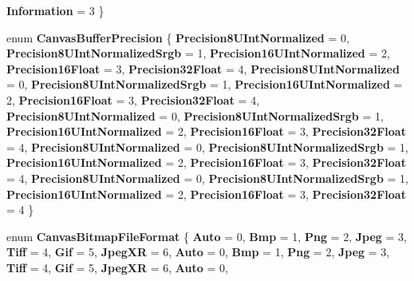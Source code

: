 \begin{DoxyCompactItemize}
{\bfseries Information} = 3
 \}
\item 
\mbox{\label{namespace_microsoft_1_1_graphics_1_1_canvas_a9383a4c9a246b43c162a06fc29843c53}} 
enum {\bfseries Canvas\+Buffer\+Precision} \{ \newline
{\bfseries Precision8\+U\+Int\+Normalized} = 0, 
{\bfseries Precision8\+U\+Int\+Normalized\+Srgb} = 1, 
{\bfseries Precision16\+U\+Int\+Normalized} = 2, 
{\bfseries Precision16\+Float} = 3, 
\newline
{\bfseries Precision32\+Float} = 4, 
{\bfseries Precision8\+U\+Int\+Normalized} = 0, 
{\bfseries Precision8\+U\+Int\+Normalized\+Srgb} = 1, 
{\bfseries Precision16\+U\+Int\+Normalized} = 2, 
\newline
{\bfseries Precision16\+Float} = 3, 
{\bfseries Precision32\+Float} = 4, 
{\bfseries Precision8\+U\+Int\+Normalized} = 0, 
{\bfseries Precision8\+U\+Int\+Normalized\+Srgb} = 1, 
\newline
{\bfseries Precision16\+U\+Int\+Normalized} = 2, 
{\bfseries Precision16\+Float} = 3, 
{\bfseries Precision32\+Float} = 4, 
{\bfseries Precision8\+U\+Int\+Normalized} = 0, 
\newline
{\bfseries Precision8\+U\+Int\+Normalized\+Srgb} = 1, 
{\bfseries Precision16\+U\+Int\+Normalized} = 2, 
{\bfseries Precision16\+Float} = 3, 
{\bfseries Precision32\+Float} = 4, 
\newline
{\bfseries Precision8\+U\+Int\+Normalized} = 0, 
{\bfseries Precision8\+U\+Int\+Normalized\+Srgb} = 1, 
{\bfseries Precision16\+U\+Int\+Normalized} = 2, 
{\bfseries Precision16\+Float} = 3, 
\newline
{\bfseries Precision32\+Float} = 4
 \}
\item 
\mbox{\label{namespace_microsoft_1_1_graphics_1_1_canvas_a912d98ef415ce79b96eeb1280290df73}} 
enum {\bfseries Canvas\+Bitmap\+File\+Format} \{ \newline
{\bfseries Auto} = 0, 
{\bfseries Bmp} = 1, 
{\bfseries Png} = 2, 
{\bfseries Jpeg} = 3, 
\newline
{\bfseries Tiff} = 4, 
{\bfseries Gif} = 5, 
{\bfseries Jpeg\+XR} = 6, 
{\bfseries Auto} = 0, 
\newline
{\bfseries Bmp} = 1, 
{\bfseries Png} = 2, 
{\bfseries Jpeg} = 3, 
{\bfseries Tiff} = 4, 
\newline
{\bfseries Gif} = 5, 
{\bfseries Jpeg\+XR} = 6, 
{\bfseries Auto} = 0, 

\end{DoxyCompactItemize}
